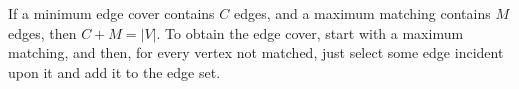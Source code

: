 If a minimum edge cover contains $C$ edges, and a maximum matching contains $M$
edges, then $C + M = |V|$. To obtain the edge cover, start with a maximum
matching, and then, for every vertex not matched, just select some edge
incident upon it and add it to the edge set. 